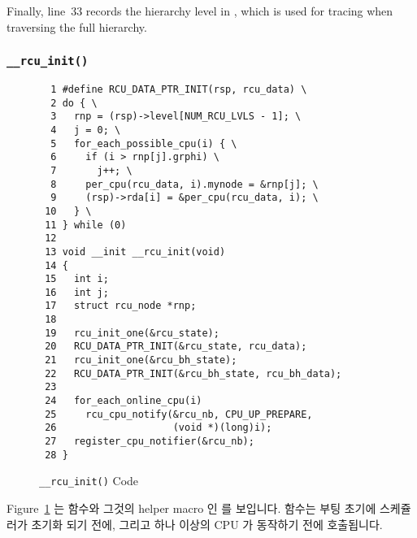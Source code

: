 Finally, line~33 records the hierarchy level in ,
which is used for tracing when traversing the full hierarchy.
\fi

\subsubsection{\tt \_\_rcu\_init()}
\label{app:rcuimpl:rcutreewt:rcu-init}

\begin{figure}[tbp]
{ \scriptsize
\begin{verbatim}
  1 #define RCU_DATA_PTR_INIT(rsp, rcu_data) \
  2 do { \
  3   rnp = (rsp)->level[NUM_RCU_LVLS - 1]; \
  4   j = 0; \
  5   for_each_possible_cpu(i) { \
  6     if (i > rnp[j].grphi) \
  7       j++; \
  8     per_cpu(rcu_data, i).mynode = &rnp[j]; \
  9     (rsp)->rda[i] = &per_cpu(rcu_data, i); \
 10   } \
 11 } while (0)
 12
 13 void __init __rcu_init(void)
 14 {
 15   int i;
 16   int j;
 17   struct rcu_node *rnp;
 18
 19   rcu_init_one(&rcu_state);
 20   RCU_DATA_PTR_INIT(&rcu_state, rcu_data);
 21   rcu_init_one(&rcu_bh_state);
 22   RCU_DATA_PTR_INIT(&rcu_bh_state, rcu_bh_data);
 23
 24   for_each_online_cpu(i)
 25     rcu_cpu_notify(&rcu_nb, CPU_UP_PREPARE,
 26                    (void *)(long)i);
 27   register_cpu_notifier(&rcu_nb);
 28 }
\end{verbatim}
}
\caption{{\tt \_\_rcu\_init()} Code}
\label{fig:app:rcuimpl:rcutreewt:Code for rcu-init}
\end{figure}

Figure~\ref{fig:app:rcuimpl:rcutreewt:Code for rcu-init}
는 \co{__rcu_init()} 함수와 그것의 helper macro 인  를
보입니다.
 함수는 부팅 초기에 스케쥴러가 초기화 되기 전에, 그리고 하나
이상의 CPU 가 동작하기 전에 호출됩니다.
\iffalse

Figure~\ref{fig:app:rcuimpl:rcutreewt:Code for rcu-init}
shows the \co{__rcu_init()} function and its \co{RCU_DATA_PTR_INIT()}
helper macro.
The \co{__rcu_init()} function is invoked during early boot,
before the scheduler has initialized, and before more than one
CPU is running.
\fi

